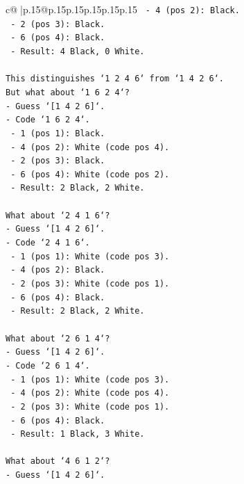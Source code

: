 \documentclass{article}
\begin{document}
{\begin{supertabular}{c@{$\;$}|p{.15\linewidth}@{}p{.15\linewidth}p{.15\linewidth}p{.15\linewidth}p{.15\linewidth}p{.15\linewidth}}
{{{\texttt{  {-} 4 (pos 2): Black.} \\
\texttt{  {-} 2 (pos 3): Black.} \\
\texttt{  {-} 6 (pos 4): Black.} \\
\texttt{  {-} Result: 4 Black, 0 White.} \\
\\ 
\texttt{This distinguishes `1 2 4 6` from `1 4 2 6`.} \\
\texttt{But what about `1 6 2 4`?} \\
\texttt{{-} Guess `{[}1 4 2 6{]}`.} \\
\texttt{{-} Code `1 6 2 4`.} \\
\texttt{  {-} 1 (pos 1): Black.} \\
\texttt{  {-} 4 (pos 2): White (code pos 4).} \\
\texttt{  {-} 2 (pos 3): Black.} \\
\texttt{  {-} 6 (pos 4): White (code pos 2).} \\
\texttt{  {-} Result: 2 Black, 2 White.} \\
\\ 
\texttt{What about `2 4 1 6`?} \\
\texttt{{-} Guess `{[}1 4 2 6{]}`.} \\
\texttt{{-} Code `2 4 1 6`.} \\
\texttt{  {-} 1 (pos 1): White (code pos 3).} \\
\texttt{  {-} 4 (pos 2): Black.} \\
\texttt{  {-} 2 (pos 3): White (code pos 1).} \\
\texttt{  {-} 6 (pos 4): Black.} \\
\texttt{  {-} Result: 2 Black, 2 White.} \\
\\ 
\texttt{What about `2 6 1 4`?} \\
\texttt{{-} Guess `{[}1 4 2 6{]}`.} \\
\texttt{{-} Code `2 6 1 4`.} \\
\texttt{  {-} 1 (pos 1): White (code pos 3).} \\
\texttt{  {-} 4 (pos 2): White (code pos 4).} \\
\texttt{  {-} 2 (pos 3): White (code pos 1).} \\
\texttt{  {-} 6 (pos 4): Black.} \\
\texttt{  {-} Result: 1 Black, 3 White.} \\
\\ 
\texttt{What about `4 6 1 2`?} \\
\texttt{{-} Guess `{[}1 4 2 6{]}`.} \\
}}}
\end{supertabular}}
\end{document}
